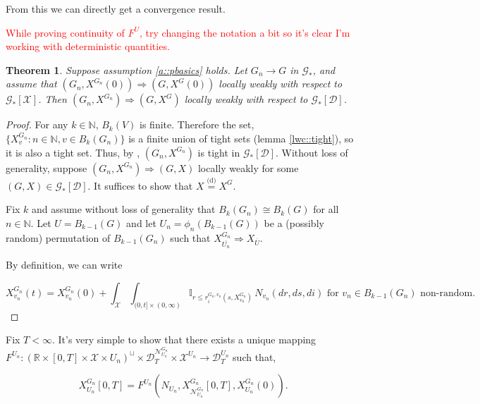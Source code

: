 \documentclass[12pt]{article}
\newcommand{\mb}{\mathbb}
\newcommand{\mc}{\mathcal}
\newcommand{\ra}{\rightarrow}
\newcommand{\ov}{\overline}
\newcommand{\te}{\text}
\newcommand{\tr}{\textcolor{red}}
\newcommand{\ind}{\hspace{24pt}}
\newcommand{\deq}{\overset{\text{(d)}}{=}}			%
\newcommand{\cad}{\mc{D}}							%
\newcommand{\sta}{\mc{X}}							%
\newcommand{\gneigh}[2]{\mc{N}^{#1}_{#2}}			%
\newcommand{\cl}[1]{\ov{#1}}						%
\newcommand{\Xf}{X}									%
\newcommand{\poiss}{N}								%
\newcommand{\rate}{r}								%
\newcommand{\poissv}[1]{_{#1}}						%
\newcommand{\vind}[1]{_{#1}}						%
\newcommand{\tme}[1]{(#1)}							%
\newcommand{\tmi}[1]{#1}							%
\newcommand{\gind}[1]{^{#1}}						%
\newcommand{\vpara}[1]{^{#1}}						%
\newcommand{\stpara}[1]{_{#1}}						%
\newcommand{\tpara}[1]{_{#1}}						%
\newcommand{\gvpara}[2]{^{#1,#2}}					%
\newcommand{\tmepro}[2]{(#1,#2)}					%
\newcommand{\Gs}{\mc{G}_\ast}						%
\newcommand{\trnc}[1]{B_{#1}}						%
\renewcommand{\sp}[1]{[#1]}							%
\renewcommand{\it}[1]{_{#1}}						%
\newtheorem{thms}{Theorem}[section]
\begin{document}
From this we can directly get a convergence result.

\tr{While proving continuity of \(F\vpara{U}\), try changing the notation a bit so it's clear I'm working with deterministic quantities.}
\begin{thms}
Suppose assumption \ref{a::pbasics} holds. Let \(G\it{n} \ra G\) in \(\Gs\), and assume that \((G\it{n},\Xf\gind{G\it{n}}\tme{0}) \Rightarrow (G,\Xf\gind{G}\tme{0})\) locally weakly with respect to \(\Gs\sp{\sta}\). Then \((G\it{n},\Xf\gind{G\it{n}}) \Rightarrow (G,\Xf\gind{G})\) locally weakly with respect to \(\Gs\sp{\cad}\).
\label{lwc::lwcthm}
\end{thms}
\begin{proof}
For any \(k \in \mb{N}\), \(\trnc{k}(V)\) is finite. Therefore the set, \(\{\Xf\gind{G\it{n}}\vind{v}: n \in \mb{N}, v \in \trnc{k}(G\it{n})\}\) is a finite union of tight sets (lemma \ref{lwc::tight}), so it is also a tight set. Thus, by \cite[Lemma A.6]{LacRamWu19}, \((G\it{n},\Xf\gind{G\it{n}})\) is tight in \(\Gs\sp{\cad}\). Without loss of generality, suppose \((G\it{n},\Xf\gind{G\it{n}}) \Rightarrow (G,\Xf)\) locally weakly for some \((G,\Xf) \in \Gs\sp{\cad}\). It suffices to show that \(\Xf \deq \Xf\gind{G}\).

\ind Fix \(k\) and assume without loss of generality that \(\trnc{k}(G\it{n}) \cong \trnc{k}(G)\) for all \(n\in \mb{N}\). Let \(U = \trnc{k-1}(G)\) and let \(U\it{n} = \phi_n(\trnc{k-1}(G))\) be a (possibly random) permutation of \(\trnc{k-1}(G\it{n})\) such that \(\Xf\gind{G\it{n}}\vind{\cl{U\it{n}}} \Rightarrow \Xf\vind{\cl{U}}\).

\ind By definition, we can write

\[\Xf\gind{G\it{n}}\vind{v\it{n}}\tme{t} = \Xf\gind{G\it{n}}\vind{v\it{n}}\tme{0} + \int_\sta\int_{(0,t]\times (0,\infty)} \mb{I}_{r \leq \rate\gvpara{G\it{n}}{v\it{n}}\stpara{i}\tmepro{s}{\Xf\gind{G\it{n}}\vind{v\it{n}}}}\,\poiss\poissv{v\it{n}}(dr,ds,di) \te{ for } v\it{n}\in \trnc{k-1}(G\it{n}) \te{ non-random}.\]
\end{proof}

Fix \(T < \infty\). It's very simple to show that there exists a unique mapping \(F\vpara{U\it{n}}:(\mb{R}\times [0,T]\times \sta \times U\it{n})^\sqcup \times \cad\tpara{T}\vpara{\gneigh{G\it{n}}{U\it{n}}} \times \sta\vpara{U\it{n}} \ra \cad\vpara{U\it{n}}\tpara{T}\) such that,

\[\Xf\gind{G\it{n}}\vind{U\it{n}}\tmi{[0,T]} = F\vpara{U\it{n}}\left(\poiss\poissv{U\it{n}}, \Xf\gind{G\it{n}}\vind{\gneigh{G\it{n}}{U\it{n}}}\tmi{[0,T]}, \Xf\gind{G\it{n}}\vind{U\it{n}}\tme{0}\right).\]
\end{document}
